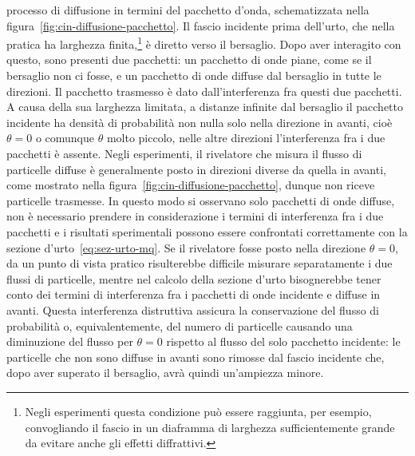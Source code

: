 \documentclass[a4paper,fleqn,twoside,12pt]{article}
\begin{document}
processo di diffusione in termini del pacchetto d'onda, schematizzata nella
figura~\ref{fig:cin-diffusione-pacchetto}.  Il fascio incidente prima dell'urto,
che nella pratica ha larghezza
finita,\footnote{Negli esperimenti questa condizione può essere raggiunta, per
  esempio, convogliando il fascio in un diaframma di larghezza sufficientemente
  grande da evitare anche gli effetti diffrattivi.}
è diretto verso il bersaglio.  Dopo aver interagito con questo, sono presenti
due pacchetti: un pacchetto di onde piane, come se il bersaglio non ci fosse, e
un pacchetto di onde diffuse dal bersaglio in tutte le direzioni.  Il pacchetto
trasmesso è dato dall'interferenza fra questi due pacchetti.  A causa della sua
larghezza limitata, a distanze infinite dal bersaglio il pacchetto incidente ha
densità di probabilità non nulla solo nella direzione in avanti, cioè
$\theta = 0$ o comunque $\theta$ molto piccolo, nelle altre direzioni
l'interferenza fra i due pacchetti è assente.  Negli esperimenti, il rivelatore
che misura il flusso di particelle diffuse è generalmente posto in direzioni
diverse da quella in avanti, come mostrato nella
figura~\ref{fig:cin-diffusione-pacchetto}, dunque non riceve particelle
trasmesse.  In questo modo si osservano solo pacchetti di onde diffuse, non è
necessario prendere in considerazione i termini di interferenza fra i due
pacchetti e i risultati sperimentali possono essere confrontati correttamente
con la sezione d'urto~\eqref{eq:sez-urto-mq}.  Se il rivelatore fosse posto
nella direzione $\theta = 0$, da un punto di vista pratico risulterebbe
difficile misurare separatamente i due flussi di particelle, mentre nel calcolo
della sezione d'urto bisognerebbe tener conto dei termini di interferenza fra i
pacchetti di onde incidente e diffuse in avanti.  Questa interferenza
distruttiva assicura la conservazione del flusso di probabilità o,
equivalentemente, del numero di particelle causando una diminuzione del flusso
per $\theta = 0$ rispetto al flusso del solo pacchetto incidente: le particelle
che non sono diffuse in avanti sono rimosse dal fascio incidente che, dopo aver
superato il bersaglio, avrà quindi un'ampiezza minore.

\end{document}
